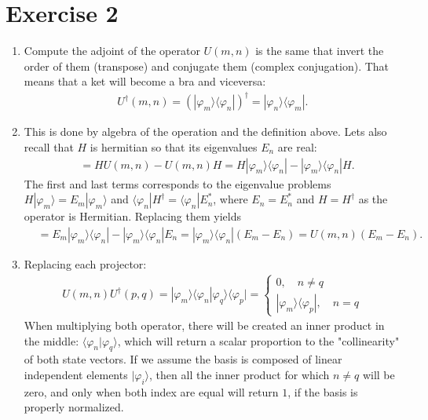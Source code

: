 \documentclass[letterpaper,11pt,twoside]{article}
\begin{document}
\section{Exercise 2}
\begin{enumerate}[itemsep=0pt,topsep=0pt,label=\alph*.]
  \item Compute the adjoint of the operator $U(m,n)$ is the same that invert the order of them (transpose) and conjugate them (complex conjugation).
  That means that a ket will become a bra and viceversa: 
  \begin{align*}
    U^\dagger(m,n)=(|\varphi_m\rangle\langle\varphi_n|)^\dagger=|\varphi_n\rangle\langle \varphi_m|.
  \end{align*}
  \item This is done by algebra of the operation and the definition above. Lets also
  recall that $H$ is hermitian so that its eigenvalues $E_n$ are real:
  \begin{align*}
    [H,U(m,n)]&=HU(m,n)-U(m,n)H=H|\varphi_m\rangle\langle\varphi_n|-|\varphi_m\rangle\langle\varphi_n|H.
  \end{align*}
  The first and last terms corresponds to the eigenvalue problems $H|\varphi_m\rangle=E_m|\varphi_m\rangle$ and $\langle\varphi_n|H^\dagger=\langle\varphi_n|E^*_n$, where 
  $E_n=E^*_n$ and $H=H^\dagger$ as the operator is Hermitian. Replacing them yields
  \begin{align*}
    [H,U(m,n)]&=E_m|\varphi_m\rangle\langle\varphi_n|-|\varphi_m\rangle \langle\varphi_ n|E_n=|\varphi_m\rangle \langle\varphi_ n|(E_m-E_n)=U(m,n)(E_m-E_n).
  \end{align*}
  \item Replacing each projector:
  \begin{align*}
    U(m,n)U^\dagger (p,q)=|\varphi_m\rangle\langle\varphi_n|\varphi_q\rangle\langle\varphi_p|=\begin{cases}
      0,\quad n\neq q\\
      |\varphi_m\rangle\langle\varphi_p|,\quad n=q
    \end{cases}
  \end{align*}
  When multiplying both operator, there will be created an inner product in the middle: $\langle\varphi_n|\varphi_q\rangle$, which 
  will return a scalar proportion to the "collinearity" of both state vectors. If we assume the basis is composed of linear independent elements $|\varphi_i\rangle$,
  then all the inner product for which $n\neq q$ will be zero, and only when both index are equal will return $1$, if the basis is properly normalized.

\end{enumerate}
\end{document}
